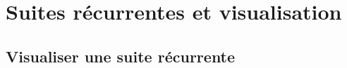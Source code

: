 \documentclass[class=report,crop=false]{standalone}
\begin{document}


\setcounter{section}{3}
\section{Suites récurrentes et visualisation}

\subsection{Visualiser une suite récurrente}
\end{document}
